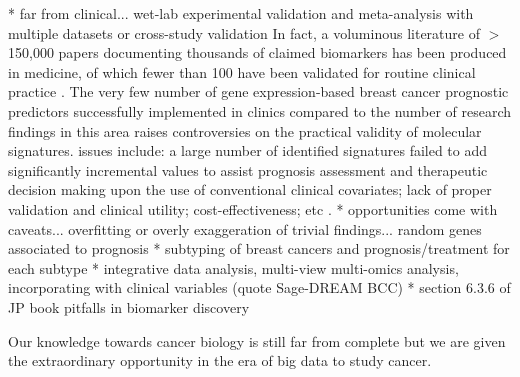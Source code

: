 * far from clinical... wet-lab experimental validation and meta-analysis with multiple datasets or cross-study validation
In fact, a voluminous literature of $>$150,000 papers documenting thousands of claimed biomarkers has been produced in medicine, of which fewer than 100 have been validated for routine clinical practice \cite{Poste2011Bring}. The very few number of gene expression-based breast cancer prognostic predictors successfully implemented in clinics compared to the number of research findings in this area raises controversies on the practical validity of molecular signatures. issues include: a large number of identified signatures failed to add significantly incremental values to assist prognosis assessment and therapeutic decision making upon the use of conventional clinical covariates; lack of proper validation and clinical utility; cost-effectiveness; etc \cite{Michiels2016Statistical}.
* opportunities come with caveats... overfitting or overly exaggeration of trivial findings... random genes associated to prognosis \cite{Venet2011Most}
* subtyping of breast cancers and prognosis/treatment for each subtype
* integrative data analysis, multi-view multi-omics analysis, incorporating with clinical variables (quote Sage-DREAM BCC)
* section 6.3.6 of JP book pitfalls in biomarker discovery

Our knowledge towards cancer biology is still far from complete but we are given the extraordinary opportunity in the era of big data to study cancer.
